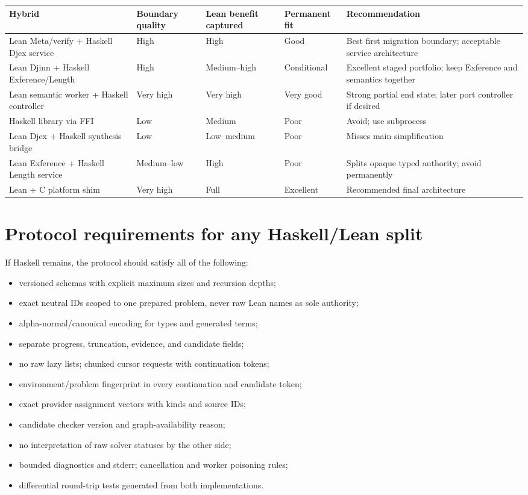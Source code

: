 \documentclass[10pt,letterpaper,oneside]{report}
\begin{document}
\begin{longtable}{@{}L{0.21\textwidth}C{0.11\textwidth}C{0.13\textwidth}C{0.13\textwidth}L{0.27\textwidth}@{}}
\toprule
\textbf{Hybrid} & \textbf{Boundary quality} & \textbf{Lean benefit captured} & \textbf{Permanent fit} & \textbf{Recommendation} \\
\midrule
\endhead
Lean Meta/verify + Haskell Djex service & High & High & Good & Best first migration boundary; acceptable service architecture \\
Lean Djinn + Haskell Exference/Length & High & Medium--high & Conditional & Excellent staged portfolio; keep Exference and semantics together \\
Lean semantic worker + Haskell controller & Very high & Very high & Very good & Strong partial end state; later port controller if desired \\
Haskell library via FFI & Low & Medium & Poor & Avoid; use subprocess \\
Lean Djex + Haskell synthesis bridge & Low & Low--medium & Poor & Misses main simplification \\
Lean Exference + Haskell Length service & Medium--low & High & Poor & Splits opaque typed authority; avoid permanently \\
Lean + C platform shim & Very high & Full & Excellent & Recommended final architecture \\
\bottomrule
\end{longtable}

\section{Protocol requirements for any Haskell/Lean split}

If Haskell remains, the protocol should satisfy all of the following:

\begin{itemize}
  \item versioned schemas with explicit maximum sizes and recursion depths;
  \item exact neutral IDs scoped to one prepared problem, never raw Lean names as sole authority;
  \item alpha-normal/canonical encoding for types and generated terms;
  \item separate progress, truncation, evidence, and candidate fields;
  \item no raw lazy lists; chunked cursor requests with continuation tokens;
  \item environment/problem fingerprint in every continuation and candidate token;
  \item exact provider assignment vectors with kinds and source IDs;
  \item candidate checker version and graph-availability reason;
  \item no interpretation of raw solver statuses by the other side;
  \item bounded diagnostics and stderr; cancellation and worker poisoning rules;
  \item differential round-trip tests generated from both implementations.
\end{itemize}
\end{document}
